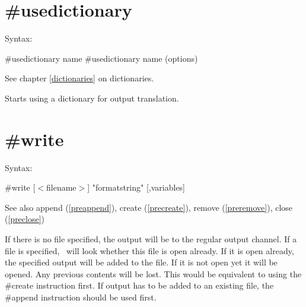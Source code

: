  
\section{\#usedictionary}
\label{preusedictionary}

\noindent Syntax:

\#usedictionary name
\#usedictionary name (options)
 
\noindent See chapter \ref{dictionaries} on dictionaries.

\noindent Starts using a dictionary for output translation.


\section{\#write}
\label{prewrite}

\noindent Syntax:

\#write [$<$filename$>$] "formatstring" [,variables]
 
\noindent See also append (\ref{preappend}),
            create (\ref{precreate}), remove (\ref{preremove}),
            close (\ref{preclose})

\noindent If there is no file specified, the output will be 
to the regular output channel. If a file is 
specified, \FORM\ will look whether this file is open already. If it is open 
already, the specified output will be added to the file. If it is not open 
yet it will be opened. Any previous contents will be lost. This would be 
equivalent to using the \#create instruction first. If 
output has to be added to an existing file, the \#append 
instruction should be used first.

